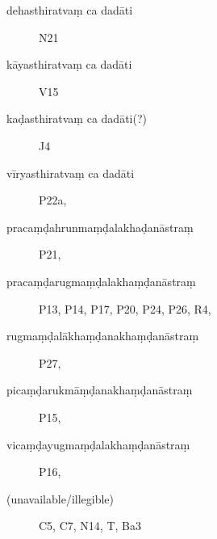 \begin{ekdosis}
\begin{marma}[hp01_027]
\begin{description}
    \item[dehasthiratvaṃ ca dadāti] N21
    \item[kāyasthiratvaṃ ca dadāti] V15
    \item[kaḍasthiratvaṃ ca dadāti(?)] J4
    \item[vīryasthiratvaṃ ca dadāti] P22a,
    \item[pracaṃḍahrunmaṃḍalakhaḍanāstraṃ] P21, 
    \item[pracaṃḍarugmaṃḍalakhaṃḍanāstraṃ] P13, P14, P17, P20, P24, P26, R4, 
    \item[rugmaṃḍalākhaṃḍanakhaṃḍanāstraṃ] P27,
    \item[picaṃḍarukmāṃḍanakhaṃḍanāstraṃ] P15,
    \item[vicaṃḍayugmaṃḍalakhaṃḍanāstraṃ] P16,
    \item[(unavailable/illegible)] C5, C7, N14, T, Ba3
    \end{description}
 \end{marma}

 
 

\end{ekdosis}
